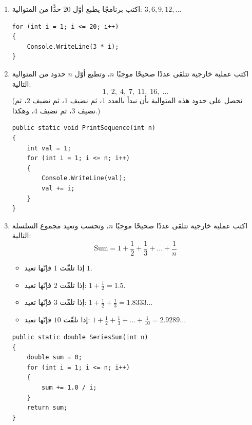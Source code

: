 \documentclass[14pt]{extarticle}
\begin{document}
\begin{enumerate}[resume, itemsep=2em]

\item اكتب برنامجًا يطبع أوّل $20$ حدًّا من المتوالية: $3, 6, 9, 12, \dots$
\ifwithsols
\begin{boxSolution}
\begin{english}
\begin{verbatim}
for (int i = 1; i <= 20; i++)
{
    Console.WriteLine(3 * i);
}
\end{verbatim}
\end{english}
\end{boxSolution}
\fi
\filbreak

\item اكتب عملية خارجية تتلقى عددًا صحيحًا موجبًا $n$، وتطبع أوّل $n$ حدود من المتوالية التالية:
\[ 1,\; 2,\; 4,\; 7,\; 11,\; 16,\; \ldots \]
(نحصل على حدود هذه المتوالية بأن نبدأ بالعدد $1$، ثم نضيف $1$، ثم نضيف $2$، ثم نضيف $3$، ثم نضيف $4$، وهكذا.)
\ifwithsols
\begin{boxSolution}
\begin{english}
\begin{verbatim}
public static void PrintSequence(int n)
{
    int val = 1;
    for (int i = 1; i <= n; i++)
    {
        Console.WriteLine(val);
        val += i;
    }
}
\end{verbatim}
\end{english}
\end{boxSolution}
\fi
\filbreak

\item اكتب عملية خارجية تتلقى عددًا صحيحًا موجبًا $n$، وتحسب وتعيد مجموع السلسلة التالية:
\[ \text{Sum} = 1 + \frac{1}{2} + \frac{1}{3} + \dots + \frac{1}{n} \]
\ifdetailed
\begin{boxExample}
\begin{itemize}[nosep]
    \item إذا تلقّت $1$ فإنّها تعيد $1$.
    \item إذا تلقّت $2$ فإنّها تعيد: $1 + \frac{1}{2} = 1.5$.
    \item إذا تلقّت $3$ فإنّها تعيد: $1 + \frac{1}{2} + \frac{1}{3} = 1.8333\dots$
    \item إذا تلقّت $10$ فإنّها تعيد: $1 + \frac{1}{2} + \frac{1}{3} + \ldots + \frac{1}{10} = 2.9289\dots$
\end{itemize}
\end{boxExample}
\fi
\ifwithsols
\begin{boxSolution}
\begin{english}
\begin{verbatim}
public static double SeriesSum(int n)
{
    double sum = 0;
    for (int i = 1; i <= n; i++)
    {
        sum += 1.0 / i;
    }
    return sum;
}
\end{verbatim}
\end{english}
\end{boxSolution}
\fi
\filbreak


\end{enumerate}
\end{document}
